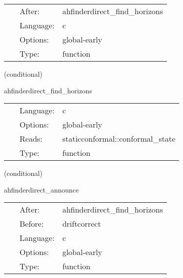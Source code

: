 \hspace{5mm}{\it save apparent horizon(s) into cactus variables } 


\hspace{5mm}

 \begin{tabular*}{160mm}{cll} 
~ & After:  & ahfinderdirect\_find\_horizons \\ 
~ & Language:  & c \\ 
~ & Options:  & global-early \\ 
~ & Type:  & function \\ 
\end{tabular*} 


\vspace{5mm}

   (conditional) 

\hspace{5mm} ahfinderdirect\_find\_horizons 

\hspace{5mm}{\it find apparent horizon(s) after this time step } 


\hspace{5mm}

 \begin{tabular*}{160mm}{cll} 
~ & Language:  & c \\ 
~ & Options:  & global-early \\ 
~ & Reads:  & staticconformal::conformal\_state \\ 
~ & Type:  & function \\ 
\end{tabular*} 


\vspace{5mm}

   (conditional) 

\hspace{5mm} ahfinderdirect\_announce 

\hspace{5mm}{\it announce horizon position(s) to other thorns } 


\hspace{5mm}

 \begin{tabular*}{160mm}{cll} 
~ & After:  & ahfinderdirect\_find\_horizons \\ 
~ & Before:  & driftcorrect \\ 
~ & Language:  & c \\ 
~ & Options:  & global-early \\ 
~ & Type:  & function \\ 
\end{tabular*} 


